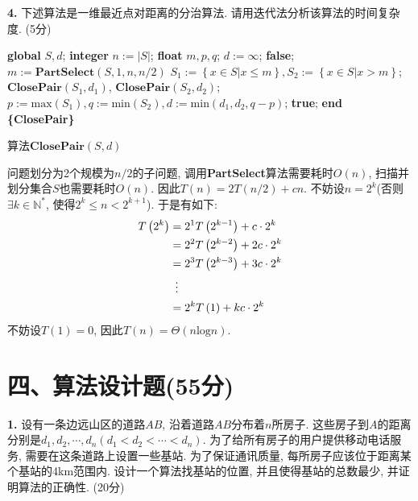 \documentclass{article}
\begin{document}
\newpage

\textbf{4.} 下述算法是一维最近点对距离的分治算法. 请用迭代法分析该算法的时间复杂度. (5分)

\begin{algorithm}[H]
    \begin{algorithmic}[1]
    \State \textbf{global} $S,d$;
    \State \textbf{integer} $n:=|S|$;
    \State \textbf{float} $m,p,q$;
        \State $d:=\infty$;
        \State \Return \textbf{false};
    \EndIf
    \State $m:=\textbf{PartSelect}(S,1,n,n/2)$ 
    \State $S_1:=\left\{ x\in S|x\le m \right\} ,S_2:=\left\{ x\in S|x>m \right\}$; 
    \State $\textbf{ClosePair}(S_1,d_1)$, $\textbf{ClosePair}(S_2,d_2)$;
    \State $p:=\text{max}(S_1),q:=\text{min}(S_2),d:=\text{min}(d_1,d_2,q-p)$; 
    \State \Return \textbf{true};
    \State \textbf{end \{ClosePair\}}
    \end{algorithmic}
    \caption{算法$\textbf{ClosePair}(S,d)$}
    \label{alg:ClosePair}
\end{algorithm}

\solution 问题划分为2个规模为$n/2$的子问题, 调用\textbf{PartSelect}算法需要耗时$O(n)$, 扫描并划分集合$S$也需要耗时$O(n)$. 因此$T\left( n \right) =2T\left( n/2 \right) +cn$. 不妨设$n=2^k$(否则$\exists k\in \mathbb{N}^{\ast}$, 使得$2^k\leq n <2^{k+1}$). 于是有如下:
\begin{align}
    T\left( 2^k \right) &=2^1T\left( 2^{k-1} \right) +c\cdot 2^k \notag
    \\
    &=2^2T\left( 2^{k-2} \right) +2c\cdot 2^k \notag
    \\
    &=2^3T\left( 2^{k-3} \right) +3c\cdot 2^k \notag
    \\
    &\,\,\,\vdots \notag
    \\
    &=2^kT\left( 1 \right) +kc\cdot 2^k \notag
\end{align}
不妨设$T(1)=0$, 因此$T(n)=\Theta(n\text{log}n)$.

\section{四、算法设计题(55分)}

\textbf{1.} 设有一条边远山区的道路$AB$, 沿着道路$AB$分布着$n$所房子. 这些房子到$A$的距离分别是$d_1,d_2,\cdots,d_n(d_1<d_2<\cdots<d_n)$. 为了给所有房子的用户提供移动电话服务, 需要在这条道路上设置一些基站. 为了保证通讯质量, 每所房子应该位于距离某个基站的4km范围内. 设计一个算法找基站的位置, 并且使得基站的总数最少, 并证明算法的正确性. (20分)
\end{document}
